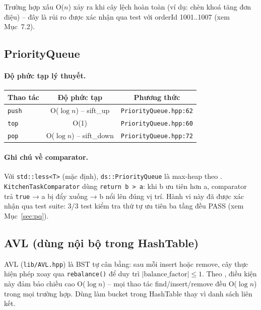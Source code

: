 \documentclass[12pt, a4paper]{article}
\begin{document}
Trường hợp xấu O($n$) xảy ra khi cây lệch hoàn toàn (ví dụ: chèn khoá tăng đơn điệu) --
đây là rủi ro được xác nhận qua test với orderId 1001..1007 (xem Mục~7.2).

\subsection{PriorityQueue}

\paragraph{Độ phức tạp lý thuyết.}
\begin{table}[H]
\centering
\begin{tabular}{lcc}
\toprule
\textbf{Thao tác} & \textbf{Độ phức tạp} & \textbf{Phương thức} \\
\midrule
\texttt{push} & O($\log n$) -- sift\_up & \texttt{PriorityQueue.hpp:62} \\
\texttt{top}  & O(1) & \texttt{PriorityQueue.hpp:60} \\
\texttt{pop}  & O($\log n$) -- sift\_down & \texttt{PriorityQueue.hpp:72} \\
\bottomrule
\end{tabular}
\end{table}

\paragraph{Ghi chú về comparator.}
Với \texttt{std::less<T>} (mặc định), \texttt{ds::PriorityQueue} là max-heap theo \cite{clrs}.
\texttt{KitchenTaskComparator} dùng \texttt{return b > a}: khi b ưu tiên hơn a, comparator trả
\texttt{true} → a bị đẩy xuống → b nổi lên đúng vị trí. Hành vi này đã được xác nhận qua test
suite: 3/3 test kiểm tra thứ tự ưu tiên ba tầng đều PASS (xem Mục~\ref{sec:pq}).

\subsection{AVL (dùng nội bộ trong HashTable)}

AVL (\texttt{lib/AVL.hpp}) là BST tự cân bằng: sau mỗi insert hoặc remove, cây thực hiện phép
xoay qua \texttt{rebalance()} để duy trì $|\text{balance\_factor}| \leq 1$. Theo \cite{clrs},
điều kiện này đảm bảo chiều cao O($\log n$) -- mọi thao tác find/insert/remove đều
O($\log n$) trong mọi trường hợp. Dùng làm bucket trong HashTable thay vì danh sách liên kết.
\end{document}
